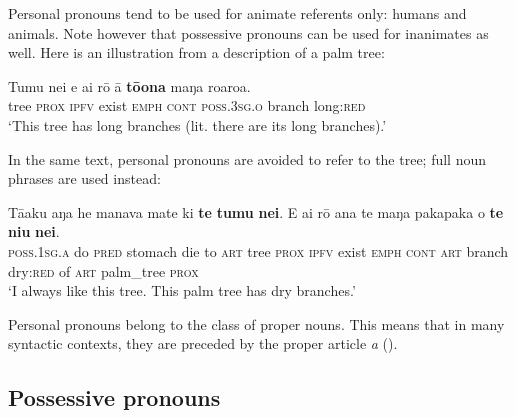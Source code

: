 Personal pronouns tend to be used for animate referents only: humans and animals. Note however that possessive pronouns can be used for inanimates as well. Here is an illustration from a description of a palm tree:

\ea\label{ex:4.1}
\gll Tumu nei e ai rō {\ꞌ}ā \textbf{tō{\ꞌ}ona} maŋa roaroa.\\
tree \textsc{prox} \textsc{ipfv} exist \textsc{emph} \textsc{cont} \textsc{poss.3sg.o} branch long:\textsc{red}\\

\glt
‘This tree has long branches (lit. there are its long branches).’ \textstyleExampleref{[R483.005]} 
\z

In the same text, personal pronouns are avoided to refer to the tree; full noun phrases are used instead:

\ea\label{ex:4.2}
\gll Tā{\ꞌ}aku aŋa he manava mate ki \textbf{te} \textbf{tumu} \textbf{nei}. E ai rō {\ꞌ}ana te maŋa pakapaka o \textbf{te} \textbf{niu} \textbf{nei}.\\
\textsc{poss.1sg.a} do \textsc{pred} stomach die to \textsc{art} tree \textsc{prox} \textsc{ipfv} exist \textsc{emph} \textsc{cont} \textsc{art} branch dry:\textsc{red} of \textsc{art} palm\_tree \textsc{prox}\\

\glt 
‘I always like this tree. This palm tree has dry branches.’ \textstyleExampleref{[R483.009–010]}
\z

Personal pronouns belong to the class of proper nouns. This means that in many syntactic contexts, they are preceded by the proper article \textit{a} (). 

\subsection{Possessive pronouns}\label{sec:4.2.2}

